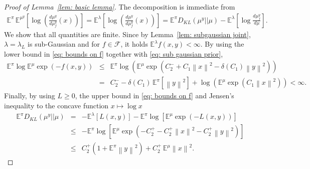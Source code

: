 \documentclass[10pt,a4paper]{amsart}
\newcommand{\E}{{\mathbb E}}
\newcommand{\F}{\mathcal{F}}
\newcommand{\KL}[2]{D_{KL}\left(#1 || #2\right)}
\newcommand{\norm}[1]{\left\|#1\right\|}
\begin{document}
\begin{proof}[Proof of Lemma~\ref{lem: basic lemma}]
The decomposition is immediate from
    \begin{eqnarray*}
         \E^\pi \, \E^{\mu^y} \left[\log\left( \frac{d \mu^y}{d \mu^y_f}(x) \right) \right]  = \E^\lambda \left[\log\left( \frac{d \mu^y}{d \mu^y_f}(x) \right) \right]
         = \E^\pi \KL{\mu^y}{\mu} - \E^\lambda \left[\log \frac{d \mu^y_f}{d\mu} \right].
    \end{eqnarray*}
    We show that all quantities are finite. Since by Lemma~\ref{lem: subgaussian joint}, $\lambda = \lambda_L$ is sub-Gaussian and for $f \in \F$, it holds
   $\E^\lambda f(x, y) <  \infty$.
    By using the lower bound in \eqref{eq: bounds on f} together with \eqref{eq: sub gaussian prior},
    \begin{eqnarray*}
         \E^\pi \log \E^{\mu}\exp(-f(x, y))
        & \le & \E^\pi \log \left(\E^\mu \exp\left(C_2^- + C_1 \norm{x}^2 - \delta(C_1) \norm{y}^2 \right) \right) \\
        & = & C_2^- - \delta(C_1) \, \E^\pi \left[\norm{y}^2\right] + \log \left(\E^\mu \exp(C_1 \norm{x}^2) \right) < \infty.
    \end{eqnarray*}
    Finally, by using $L \ge 0$, the upper bound in \eqref{eq: bounds on f} and Jensen's inequality to the concave function $x\mapsto \log x$
    \begin{eqnarray*}
        \E^\pi \KL{\mu^y}{\mu} & = & -\E^\lambda  \left[L(x, y)\right] - \E^\pi \log \left[  \E^\mu \exp\left( -L(x, y)\right) \right]  \\
        & \le  & - \E^\pi \log \left[\E^\mu \exp\left(-C_2^+ -C_2^+ \norm{x}^2-C_2^+ \norm{y}^2\right)\right] \\
        & \le & C_2^+  (1+\E^\pi \norm{y}^2)  + C_2^+ \, \E^\mu \norm{x}^2. 
    \end{eqnarray*}
\end{proof}
\end{document}

